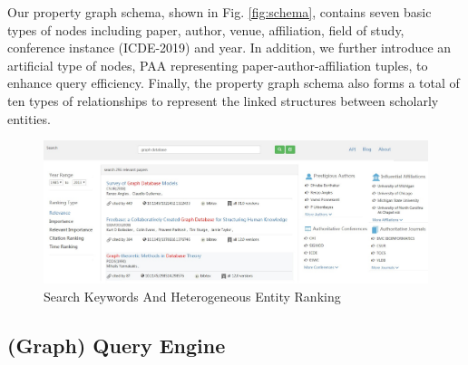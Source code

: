 Our property graph schema, shown in Fig. \ref{fig:schema}, contains seven basic types of nodes including paper, author, venue, affiliation, field of study, conference instance (\eg ICDE-2019) and year. In addition, we further introduce an artificial type of nodes, \ie PAA representing paper-author-affiliation tuples, to enhance query efficiency. Finally, the property graph schema also forms a total of ten types of relationships to represent the linked structures between scholarly entities.






\begin{figure}[tp]
\centering
\includegraphics[width=\textwidth]{searchKeywords.pdf}
\caption{Search Keywords And Heterogeneous Entity Ranking}
\label{fig: search keywords}
\vspace{-3ex}
\end{figure}

\subsection{(Graph) Query Engine}

